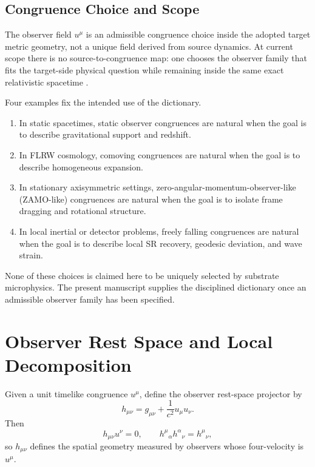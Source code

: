 \documentclass[11pt]{article}
\begin{document}
\subsection{Congruence Choice and Scope}

The observer field \(u^\mu\) is an admissible congruence choice inside the
adopted target metric geometry, not a unique field derived from source
dynamics. At current scope there is no source-to-congruence map: one chooses
the observer family that fits the target-side physical question while
remaining inside the same exact relativistic spacetime
\cite{Raychaudhuri1955,EllisVanElst1999}.

Four examples fix the intended use of the dictionary.
\begin{enumerate}
    \item In static spacetimes, static observer congruences are natural when the goal is to describe gravitational support and redshift.
    \item In FLRW cosmology, comoving congruences are natural when the goal is to describe homogeneous expansion.
    \item In stationary axisymmetric settings, zero-angular-momentum-observer-like (ZAMO-like) congruences are natural when the goal is to isolate frame dragging and rotational structure.
    \item In local inertial or detector problems, freely falling congruences are natural when the goal is to describe local SR recovery, geodesic deviation, and wave strain.
\end{enumerate}

None of these choices is claimed here to be uniquely selected by substrate microphysics. The present manuscript supplies the disciplined dictionary once an admissible observer family has been specified.

\section{Observer Rest Space and Local Decomposition}

Given a unit timelike congruence \(u^\mu\), define the observer rest-space projector by
\begin{equation}
h_{\mu\nu}
=
g_{\mu\nu}+\frac{1}{c^2}u_\mu u_\nu.
\label{eq:projector}
\end{equation}
Then
\begin{equation}
h_{\mu\nu}u^\nu = 0,
\qquad
h^\mu{}_{\alpha}h^\alpha{}_{\nu}=h^\mu{}_{\nu},
\label{eq:projectorprops}
\end{equation}
so \(h_{\mu\nu}\) defines the spatial geometry measured by observers whose four-velocity is \(u^\mu\).
\end{document}
